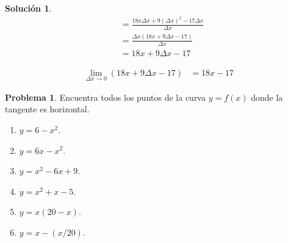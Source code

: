 \documentclass{article}
\theoremstyle{definition}
\newtheorem{problem}{Problema}
\newtheorem*{solution}{Solución}
\begin{document}
\begin{solution}
    \begin{align*}
        &= \frac{18x\Delta x+9(\Delta x)^2-17\Delta x}{\Delta x} \\
        &= \frac{\Delta x(18x+9\Delta x-17)}{\Delta x} \\
        &= 18x+9\Delta x-17
    \end{align*}

    \begin{align*}
        \lim_{\Delta x \to 0} (18x+9\Delta x-17) &= 18x-17
    \end{align*}

\end{solution}

\bigskip

\begin{problem}
Encuentra todos los puntos de la curva \( y = f(x) \) donde la tangente es horizontal.
\begin{enumerate}
    \item \( y = 6 - x^2 \).
    \item \( y = 6x - x^2 \).
    \item \( y = x^2 - 6x + 9 \).
    \item \( y = x^2 + x - 5 \).
    \item \( y = x(20 - x) \).
    \item \( y = x - (x/20) \).
\end{enumerate}
\end{problem}

\medskip
\end{document}

